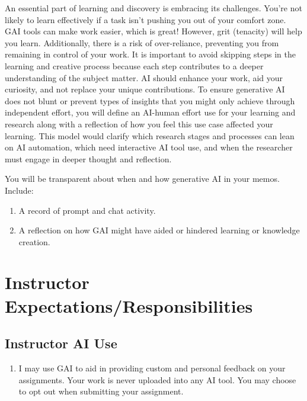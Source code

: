 \documentclass[
  12pt,
]{scrreprt}
\providecommand{\tightlist}{%
  \setlength{\itemsep}{0pt}\setlength{\parskip}{0pt}}
\begin{document}
An essential part of learning and discovery is embracing its challenges.
You're not likely to learn effectively if a task isn't pushing you out
of your comfort zone. GAI tools can make work easier, which is great!
However, grit (tenacity) will help you learn. Additionally, there is a
risk of over-reliance, preventing you from remaining in control of your
work. It is important to avoid skipping steps in the learning and
creative process because each step contributes to a deeper understanding
of the subject matter. AI should enhance your work, aid your curiosity,
and not replace your unique contributions. To ensure generative AI does
not blunt or prevent types of insights that you might only achieve
through independent effort, you will define an AI-human effort use for
your learning and research along with a reflection of how you feel this
use case affected your learning. This model would clarify which research
stages and processes can lean on AI automation, which need interactive
AI tool use, and when the researcher must engage in deeper thought and
reflection.

You will be transparent about when and how generative AI in your memos.
Include:

\begin{enumerate}
\def\labelenumi{\arabic{enumi}.}
\item
  A record of prompt and chat activity.
\item
  A reflection on how GAI might have aided or hindered learning or
  knowledge creation.
\end{enumerate}

\chapter{Instructor
Expectations/Responsibilities}\label{instructor-expectationsresponsibilities}

\section{Instructor AI Use}\label{instructor-ai-use}

\begin{enumerate}
\def\labelenumi{\arabic{enumi}.}
\tightlist
\item
  I may use GAI to aid in providing custom and personal feedback on your
  assignments. Your work is never uploaded into any AI tool. You may
  choose to opt out when submitting your assignment.
\end{enumerate}
\end{document}
